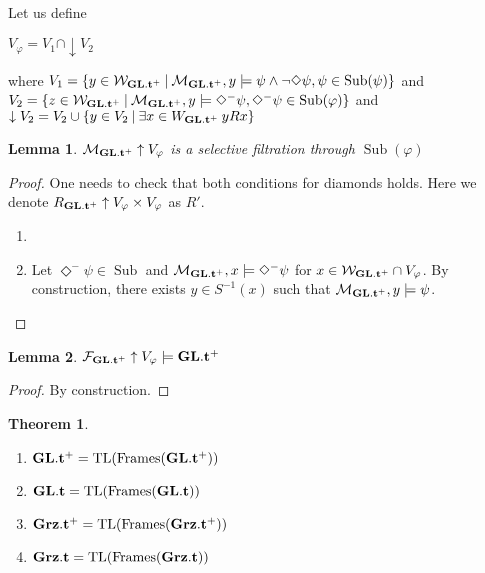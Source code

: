 \documentclass[a4paper]{article}
\theoremstyle{defin}
\theoremstyle{theorem}
\newtheorem{theorem}{Theorem}
\theoremstyle{prop}
\theoremstyle{lemma}
\newtheorem{lemma}{Lemma}
\theoremstyle{ex}
\theoremstyle{col}
\newcommand{\DiamondM}{\Diamond^{-}}
\begin{document}
Let us define

\begin{center}
$V_{\varphi} = V_1 \cap \downarrow V_2$
\end{center}
where $V_1 = \{ y \in \mathcal{W}_{{\bf GL}.{\bf t}^{+}} \: | \: \mathcal{M}_{{\bf GL}.{\bf t}^{+}}, y \models \psi \land \neg \Diamond \psi, \psi \in \operatorname{Sub}(\psi)\}$ and $V_2 = \{ z \in \mathcal{W}_{{\bf GL}.{\bf t}^{+}} \: | \: \mathcal{M}_{{\bf GL}.{\bf t}^{+}}, y \models \DiamondM \psi, \DiamondM \psi \in \operatorname{Sub}(\varphi) \}$ and $\downarrow V_2 = V_2 \cup \{ y \in V_2 \: | \: \exists x \in W_{{\bf GL}.{\bf t}^{+}} \: y R x \}$

\begin{lemma}
$\mathcal{M}_{{{\bf GL}.{\bf t}^{+}}} \uparrow V_{\varphi}$ is a selective filtration through $\operatorname{Sub}(\varphi)$
\end{lemma}

\begin{proof}
One needs to check that both conditions for diamonds holds. Here we denote $R_{{{\bf GL}.{\bf t}^{+}}} \uparrow V_{\varphi} \times V_{\varphi}$ as $R'$.

\begin{enumerate}
\item

\item Let $\DiamondM \psi \in \operatorname{Sub}$ and $\mathcal{M}_{{\bf GL}.{\bf t}^{+}}, x \models \DiamondM \psi$ for
$x \in \mathcal{W}_{{{\bf GL}.{\bf t}^{+}}} \cap V_{\varphi}$. By construction, there exists $y \in S^{-1}(x)$ such that $\mathcal{M}_{{\bf GL}.{\bf t}^{+}}, y \models \psi$.
\end{enumerate}
\end{proof}

\begin{lemma}
$\mathcal{F}_{{\bf GL}.{\bf t}^{+}} \uparrow V_{\varphi} \models {\bf GL}.{\bf t}^{+}$
\end{lemma}
\begin{proof}
By construction.
\end{proof}

\begin{theorem}
  $ $

  \begin{enumerate}
  \item ${\bf GL}.{\bf t}^{+} = \operatorname{TL}(\operatorname{Frames}({\bf GL}.{\bf t}^{+}))$
  \item ${\bf GL}.{\bf t} = \operatorname{TL}(\operatorname{Frames}({\bf GL}.{\bf t}))$
  \item ${\bf Grz}.{\bf t}^{+} = \operatorname{TL}(\operatorname{Frames}({\bf Grz}.{\bf t}^{+}))$
  \item ${\bf Grz}.{\bf t} = \operatorname{TL}(\operatorname{Frames}({\bf Grz}.{\bf t}))$
  \end{enumerate}
\end{theorem}
\end{document}
